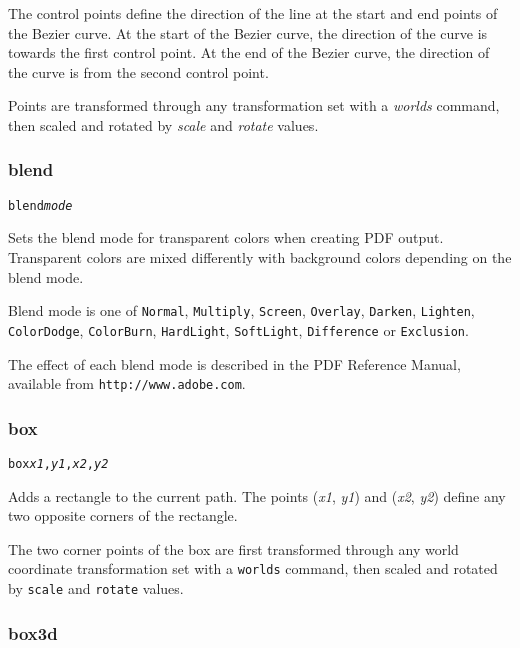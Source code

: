 The control points define the direction of the line at the start and
end points of the Bezier curve.
At the start of the Bezier curve, the direction of the curve is towards
the first control point.
At the end of the Bezier curve, the direction of the curve is from
the second control point.

Points are transformed through any
transformation set with a \textit{worlds} command,
then scaled and rotated by \textit{scale}
and \textit{rotate} values.

\subsubsection{blend}

\begin{alltt}
blend \textit{mode}
\end{alltt}

Sets the blend mode for transparent colors when creating PDF
output.  Transparent colors are mixed differently with background
colors depending on the blend mode.

Blend mode is one of \texttt{Normal},
\texttt{Multiply},
\texttt{Screen},
\texttt{Overlay},
\texttt{Darken},
\texttt{Lighten},
\texttt{ColorDodge},
\texttt{ColorBurn},
\texttt{HardLight},
\texttt{SoftLight},
\texttt{Difference} or
\texttt{Exclusion}.

The effect of each blend mode is described in the PDF Reference Manual,
available from \texttt{http://www.adobe.com}.

\subsubsection{box}

\begin{alltt}
box \textit{x1}, \textit{y1}, \textit{x2}, \textit{y2}
\end{alltt}

Adds a rectangle to the current path.
The points
(\textit{x1}, \textit{y1}) and (\textit{x2}, \textit{y2}) define
any two opposite corners of the rectangle.

The two corner points of the box
are first transformed through any world coordinate
transformation set with a \texttt{worlds} command,
then scaled and rotated by \texttt{scale}
and \texttt{rotate} values.

\subsubsection{box3d}

